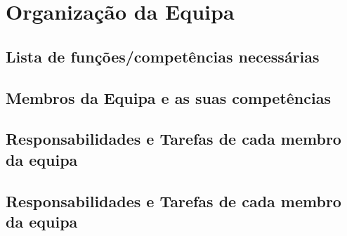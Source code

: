 \chapter{Organização da Equipa}
\label{organizacao_da_equipa}
\section{Lista de funções/competências necessárias}
\section{Membros da Equipa e as suas competências}
\section{Responsabilidades e Tarefas de cada membro da equipa}
\section{Responsabilidades e Tarefas de cada membro da equipa}
